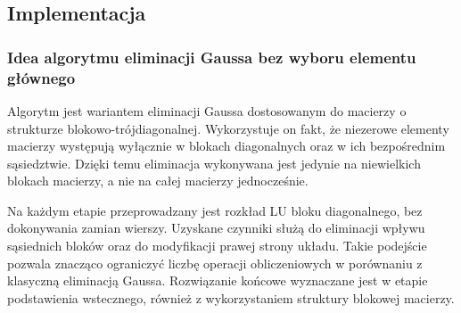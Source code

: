 \documentclass{article}
\begin{document}
\subsection*{Implementacja}

\subsubsection*{Idea algorytmu eliminacji Gaussa bez wyboru elementu głównego}
Algorytm jest wariantem eliminacji Gaussa dostosowanym do macierzy o strukturze
blokowo-trójdiagonalnej. Wykorzystuje on fakt, że niezerowe elementy macierzy
występują wyłącznie w blokach diagonalnych oraz w ich bezpośrednim sąsiedztwie.
Dzięki temu eliminacja wykonywana jest jedynie na niewielkich blokach macierzy,
a nie na całej macierzy jednocześnie.

Na każdym etapie przeprowadzany jest rozkład LU bloku diagonalnego, bez
dokonywania zamian wierszy. Uzyskane czynniki służą do eliminacji wpływu
sąsiednich bloków oraz do modyfikacji prawej strony układu. Takie podejście
pozwala znacząco ograniczyć liczbę operacji obliczeniowych w porównaniu z
klasyczną eliminacją Gaussa. Rozwiązanie końcowe wyznaczane jest w etapie
podstawienia wstecznego, również z wykorzystaniem struktury blokowej macierzy.
\end{document}
